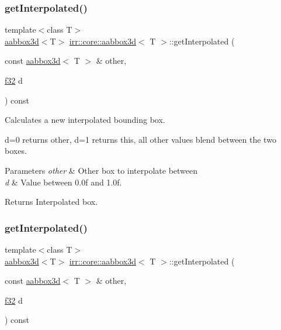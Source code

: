 \subsubsection{\texorpdfstring{get\+Interpolated()}{getInterpolated()}\hspace{0.1cm}{\footnotesize\ttfamily [1/2]}}
{\footnotesize\ttfamily template$<$class T$>$ \\
\hyperlink{classirr_1_1core_1_1aabbox3d}{aabbox3d}$<$T$>$ \hyperlink{classirr_1_1core_1_1aabbox3d}{irr\+::core\+::aabbox3d}$<$ T $>$\+::get\+Interpolated (\begin{DoxyParamCaption}\item[{const \hyperlink{classirr_1_1core_1_1aabbox3d}{aabbox3d}$<$ T $>$ \&}]{other,  }\item[{\hyperlink{namespaceirr_a0277be98d67dc26ff93b1a6a1d086b07}{f32}}]{d }\end{DoxyParamCaption}) const\hspace{0.3cm}{\ttfamily [inline]}}



Calculates a new interpolated bounding box. 

d=0 returns other, d=1 returns this, all other values blend between the two boxes. 
\begin{DoxyParams}{Parameters}
{\em other} & Other box to interpolate between \\
\hline
{\em d} & Value between 0.\+0f and 1.\+0f. \\
\hline
\end{DoxyParams}
\begin{DoxyReturn}{Returns}
Interpolated box. 
\end{DoxyReturn}
\mbox{\label{classirr_1_1core_1_1aabbox3d_a2c2073f3693819d99906f2ae36dd19de}} 
\subsubsection{\texorpdfstring{get\+Interpolated()}{getInterpolated()}\hspace{0.1cm}{\footnotesize\ttfamily [2/2]}}
{\footnotesize\ttfamily template$<$class T$>$ \\
\hyperlink{classirr_1_1core_1_1aabbox3d}{aabbox3d}$<$T$>$ \hyperlink{classirr_1_1core_1_1aabbox3d}{irr\+::core\+::aabbox3d}$<$ T $>$\+::get\+Interpolated (\begin{DoxyParamCaption}\item[{const \hyperlink{classirr_1_1core_1_1aabbox3d}{aabbox3d}$<$ T $>$ \&}]{other,  }\item[{\hyperlink{namespaceirr_a0277be98d67dc26ff93b1a6a1d086b07}{f32}}]{d }\end{DoxyParamCaption}) const\hspace{0.3cm}{\ttfamily [inline]}}



